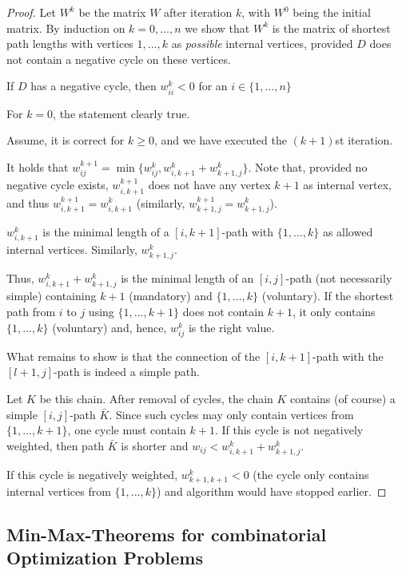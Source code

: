 \begin{proof}
\newcommand{\wii}[0]{w_{ii}}
\newcommand{\wij}[0]{w_{ij}}

Let $W^k$ be the matrix $W$ after iteration $k$, with $W^0$ being the initial matrix. By induction on $k = 0, ..., n$ we show that $W^k$ is the matrix of shortest path lengths with vertices $1, ..., k$ as \emph{possible} internal vertices, provided $D$ does not contain a negative cycle on these vertices.

If $D$ has a negative cycle, then $\wii^k < 0$ for an $i \in \{ 1, ..., n\}$

For $k = 0$, the statement clearly true.

Assume, it is correct for $k \geq 0$, and we have executed the $(k+1)$st iteration.

It holds that $\wij^{k+1} = \min\{\wij^k, w_{i,k+1}^k + w_{k+1,j}^k\}$. Note that, provided no negative cycle exists, $w_{i,k+1}^{k+1}$ does not have any vertex $k+1$ as internal vertex, and thus $w_{i,k+1}^{k+1} = w_{i,k+1}^k$ (similarly, $w_{k+1,j}^{k+1} = w_{k+1,j}^k$).

$w_{i,k+1}^k$ is the minimal length of a $[i,k+1]$-path with $\{1, ..., k\}$ as allowed internal vertices. Similarly, $w_{k+1,j}^k$.

Thus, $w_{i,k+1}^k+w_{k+1,j}^k$ is the minimal length of an $[i,j]$-path (not necessarily simple) containing $k+1$ (mandatory) and $\{ 1, ..., k \}$ (voluntary). If the shortest path from $i$ to $j$ using $\{1, ..., k+1\}$ does not contain $k+1$, it only contains $\{1, ... , k\}$ (voluntary) and, hence, $\wij^k$ is the right value.

What remains to show is that the connection of the $[i,k+1]$-path with the $[l+1,j]$-path is indeed a simple path.

Let $K$ be this chain. After removal of cycles, the chain $K$ contains (of course) a simple $[i,j]$-path $\bar K$. Since such cycles may only contain vertices from $\{1, ..., k+1\}$, one cycle must contain $k+1$.
If this cycle is not negatively weighted, then path $\bar K$ is shorter and $\wij< w_{i,k+1}^k + w_{k+1,j}^k$.

If this cycle is negatively weighted, $w_{k+1,k+1}^k<0$ (the cycle only contains internal vertices from $\{1, ..., k\}$) and algorithm would have stopped earlier.
\end{proof}

\subsection*{Min-Max-Theorems for combinatorial Optimization Problems}

